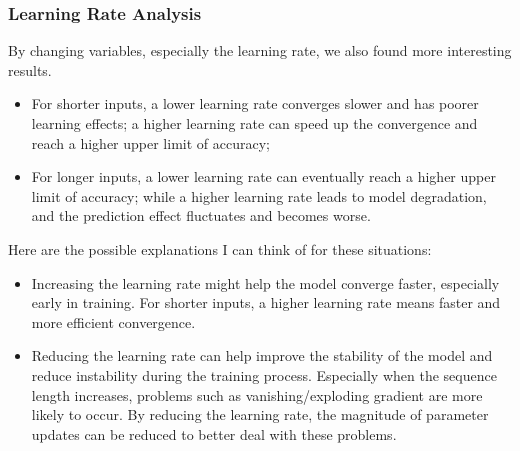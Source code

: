 \subsubsection{Learning Rate Analysis}

By changing variables, especially the learning rate, we also found more interesting results.
\begin{itemize}
  \item For shorter inputs, a lower learning rate converges slower and has poorer learning effects; a higher learning rate can speed up the convergence and reach a higher upper limit of accuracy;
  \item For longer inputs, a lower learning rate can eventually reach a higher upper limit of accuracy; while a higher learning rate leads to model degradation, and the prediction effect fluctuates and becomes worse.
\end{itemize}

Here are the possible explanations I can think of for these situations:

\begin{itemize}
  \item Increasing the learning rate might help the model converge faster, especially early in training. For shorter inputs, a higher learning rate means faster and more efficient convergence.
  \item{ Reducing the learning rate can help improve the stability of the model and reduce instability during the training process.
      Especially when the sequence length increases, problems such as vanishing/exploding gradient are more likely to occur.
      By reducing the learning rate, the magnitude of parameter updates can be reduced to better deal with these problems.
    }
\end{itemize}
